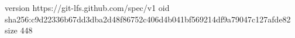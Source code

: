 version https://git-lfs.github.com/spec/v1
oid sha256:c9d22336b67dd3dba2d48f86752c406d4b041bf569214df9a79047c127afde82
size 448
